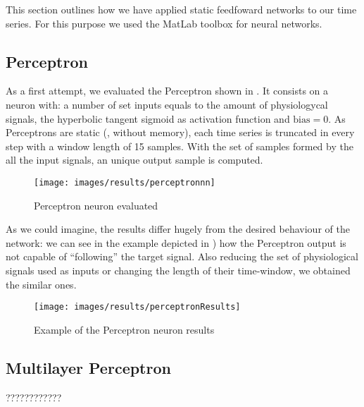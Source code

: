 \label{sec:application:feedforward}

This section outlines how we have applied static feedfoward networks to our time series. For this purpose we used the MatLab toolbox for neural networks.

\subsection{Perceptron}
\label{subsec:perceptronapplication}

As a first attempt, we evaluated the Perceptron shown in . 
It consists on a neuron with:
a number of set inputs equals to the amount of physiologycal signals, 
the hyperbolic tangent sigmoid as activation function
and $\text{bias}=0$. As Perceptrons are static (\ie, without memory), each time series is truncated in every step with a window length of 15 samples. 
With the set of samples formed by the all the input signals, an unique output sample is computed.
\begin{figure}[!ht]
\centering
\texttt{[image: images/results/perceptronnn]}
\caption{Perceptron neuron evaluated}
\label{fig:perceptronnn}
\end{figure}

As we could imagine, the results differ hugely from the desired behaviour of the network: we can see in the example depicted in ) how the Perceptron output is not capable of ``following'' the target signal.
Also reducing the set of physiological signals used as inputs or changing the length of their time-window, we obtained the similar ones.
\begin{figure}[!ht]
\centering
\texttt{[image: images/results/perceptronResults]}
\caption{Example of the Perceptron neuron results}
\label{fig:perceptronResults}
\end{figure}


\subsection{Multilayer Perceptron}
\label{subsec:mlpapplication}
????????????


